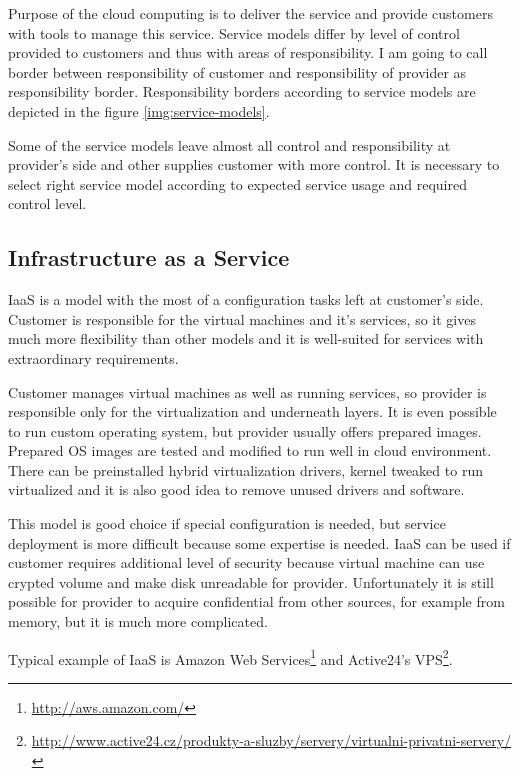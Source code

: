 
Purpose of the cloud computing is to deliver the service and provide customers with tools to manage this service. Service models differ by level of control provided to customers and thus with areas of responsibility. I am going to call border between responsibility of customer and responsibility of provider as responsibility border. Responsibility borders according to service models are depicted in the figure \ref{img:service-models}.

Some of the service models leave almost all control and responsibility at provider's side and other supplies customer with more control. It is necessary to select right service model according to expected service usage and required control level.

\subsection{Infrastructure as a Service}
\Ac{IaaS} is a model with the most of a configuration tasks left at customer's side. Customer is responsible for the virtual machines and it's services, so it gives much more flexibility than other models and it is well-suited for services with extraordinary requirements. 

Customer manages virtual machines as well as running services, so provider is responsible only for the virtualization and underneath layers. It is even possible to run custom operating system, but provider usually offers prepared images. Prepared \Ac{OS} images are tested and modified to run well in cloud environment. There can be preinstalled hybrid virtualization drivers, kernel tweaked to run virtualized and it is also good idea to remove unused drivers and software. 

This model is good choice if special configuration is needed, but service deployment is more difficult because some expertise is needed. \Ac{IaaS} can be used if customer requires additional level of security because virtual machine can use crypted volume and make disk unreadable for provider. Unfortunately it is still possible for provider to acquire confidential from other sources, for example from memory, but it is much more complicated.

Typical example of \Ac{IaaS} is Amazon Web Services\footnote{\url{http://aws.amazon.com/}} and Active24's VPS\footnote{\url{http://www.active24.cz/produkty-a-sluzby/servery/virtualni-privatni-servery/}}.

